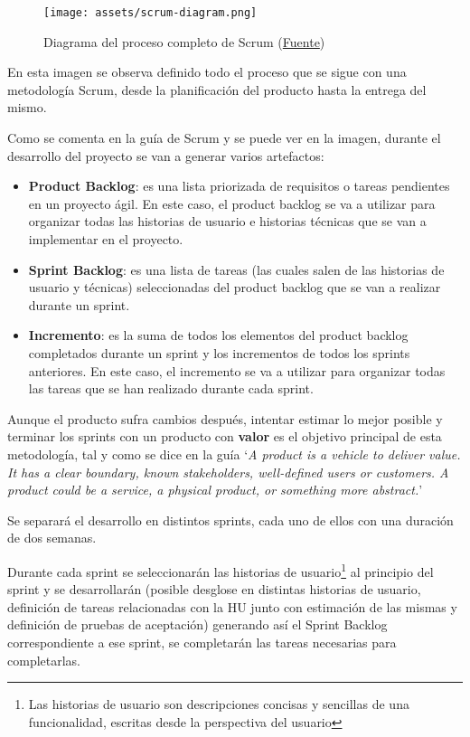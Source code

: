\begin{figure}[H]
  \centering
  \texttt{[image: assets/scrum-diagram.png]}
  \caption{Diagrama del proceso completo de Scrum (\href{https://www.lecciones-aprendidas.info/2023/09/diagrama-explicativo-scrum-guia-2020.html}{Fuente})}
  \label{fig:scrum-diagram}
\end{figure}

En esta imagen se observa definido todo el proceso que se sigue con una metodología Scrum, desde la planificación del producto hasta la entrega del mismo.

Como se comenta en la guía de Scrum y se puede ver en la imagen, durante el desarrollo del proyecto se van a generar varios artefactos:
\begin{itemize}
    \item \textbf{Product Backlog}: es una lista priorizada de requisitos o tareas pendientes en un proyecto ágil. En este caso, el product backlog se va a utilizar para organizar todas las historias de usuario e historias técnicas que se van a implementar en el proyecto.
    \item \textbf{Sprint Backlog}: es una lista de tareas (las cuales salen de las historias de usuario y técnicas) seleccionadas del product backlog que se van a realizar durante un sprint.
    \item \textbf{Incremento}: es la suma de todos los elementos del product backlog completados durante un sprint y los incrementos de todos los sprints anteriores. En este caso, el incremento se va a utilizar para organizar todas las tareas que se han realizado durante cada sprint.
\end{itemize}
Aunque el producto sufra cambios después, intentar estimar lo mejor posible y terminar los sprints con un producto con \textbf{valor} es el objetivo principal de esta metodología, tal y como se dice en la guía `\textit{A product is a vehicle to deliver value. It has a clear boundary, known stakeholders, well-defined users or customers. A product could be a service, a physical product, or something more abstract.}'

Se separará el desarrollo en distintos sprints, cada uno de ellos con una duración de dos semanas.

Durante cada sprint se seleccionarán las historias de usuario\footnote{Las historias de usuario son descripciones concisas y sencillas de una funcionalidad, escritas desde la perspectiva del usuario} al principio del sprint y se desarrollarán (posible desglose en distintas historias de usuario, definición de tareas relacionadas con la HU junto con estimación de las mismas y definición de pruebas de aceptación) generando así el Sprint Backlog correspondiente a ese sprint, se completarán las tareas necesarias para completarlas.

